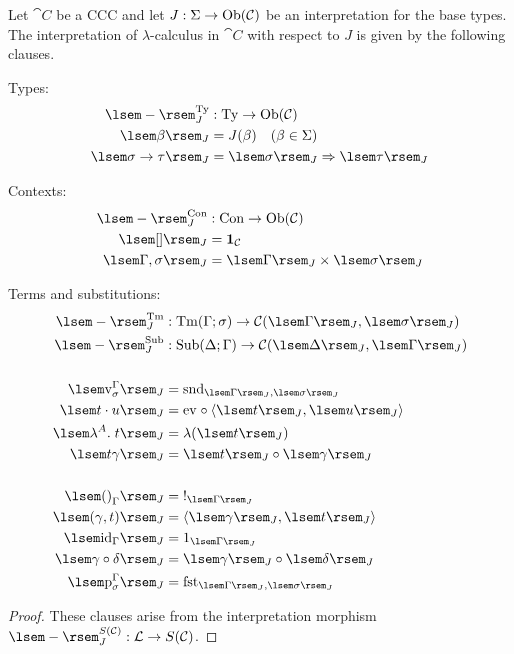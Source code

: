 \begin{cor}
Let $\cat{C}$ be a CCC and let $J : \Sigma \to \mathrm{Ob}(\mathcal{C})$ be an interpretation for the base types. The interpretation of $\lambda$-calculus in $\cat{C}$ with respect to $J$ is given by the following clauses.
\begin{enum}
\item Types:
\begin{align*}
\cintty[J]{-} &: \sTy \to \Ob{\cat{C}} \\
\cint[J]{\beta} &= J(\beta) \quad(\beta \in \Basetypes) \\
\cint[J]{\functy{\sigma}{\tau}} &= \cexp{\cint[J]{\sigma}}{\cint[J]{\tau}}
\end{align*}

\item Contexts:
\begin{align*}
\cintcon[J]{-} &: \sCon \to \Ob{\cat{C}} \\
\cint[J]{\sempcon} &= \1[\cat{C}] \\
\cint[J]{\sextcon{\Gamma}{\sigma}} &= \cprod{\cint[J]{\Gamma}}{\cint[J]{\sigma}}
\end{align*}

\item Terms and substitutions:
\begin{align*}
\cinttm[J]{-} &: \sTm{\Gamma}{\sigma} \to \Hom[\cat{C}]{\cint[J]{\Gamma}}{\cint[J]{\sigma}} \\
\cintsub[J]{-} &: \sSub{\Delta}{\Gamma} \to \Hom[\cat{C}]{\cint[J]{\Delta}}{\cint[J]{\Gamma}} \\
\\
\cint[J]{\vz[\Gamma][\sigma]} &= \msnd[\cint[J]{\Gamma}, \cint[J]{\sigma}] \\
\cint[J]{\app{t}{u}} &= \mev \circ \mpair{\cint[J]{t}}{\cint[J]{u}} \\
\cint[J]{\slam{A}{t}} &= \mcurry{\cint[J]{t}} \\
\cint[J]{\ssubst{t}{\gamma}} &= \cint[J]{t} \circ \cint[J]{\gamma} \\
\\
\cint[J]{\sempsub[\Gamma]} &= \mterm[\cint[J]{\Gamma}] \\
\cint[J]{\sextsub{\gamma}{t}} &= \mpair{\cint[J]{\gamma}}{\cint[J]{t}} \\
\cint[J]{\sidsub[\Gamma]} &= \id[\cint[J]{\Gamma}] \\
\cint[J]{\scompsub{\gamma}{\delta}} &= \cint[J]{\gamma} \circ \cint[J]{\delta} \\
\cint[J]{\spsub[\Gamma][\sigma]} &= \mfst[\cint[J]{\Gamma}, \cint[J]{\sigma}]
\end{align*}
\end{enum}
\begin{proof}
These clauses arise from the interpretation morphism $\cint[J]{-}[S(\cat{C})] : \syncat \to S(\cat{C})$.
\end{proof}
\end{cor}

